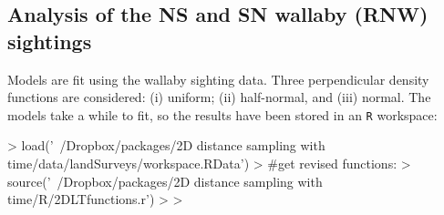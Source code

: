 \documentclass{article}
\begin{document}
\subsection{Analysis of the NS and SN wallaby (RNW) sightings}
Models are fit using the wallaby sighting data.  Three perpendicular density functions are considered: (i) uniform; (ii) half-normal, and (iii) normal.  
The models take a while to fit, so the results have been stored in an \texttt{R} workspace:
\begin{Schunk}
\begin{Sinput}
> load('~/Dropbox/packages/2D distance sampling with time/data/landSurveys/workspace.RData')
> #get revised functions:
> source('~/Dropbox/packages/2D distance sampling with time/R/2DLTfunctions.r')
> 
> 
\end{Sinput}
\end{Schunk}
\end{document}
